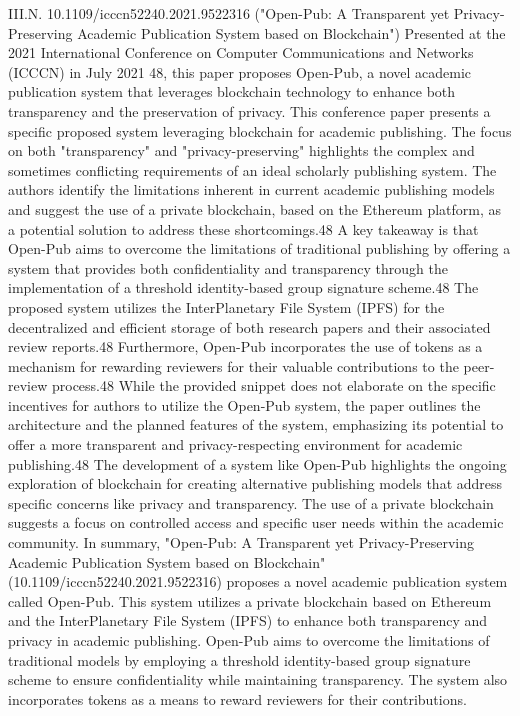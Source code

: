 \documentclass{article}
\begin{document}
III.N. 10.1109/icccn52240.2021.9522316 ("Open-Pub: A Transparent yet Privacy-Preserving Academic Publication System based on Blockchain")
Presented at the 2021 International Conference on Computer Communications and Networks (ICCCN) in July 2021 48, this paper proposes Open-Pub, a novel academic publication system that leverages blockchain technology to enhance both transparency and the preservation of privacy. This conference paper presents a specific proposed system leveraging blockchain for academic publishing. The focus on both "transparency" and "privacy-preserving" highlights the complex and sometimes conflicting requirements of an ideal scholarly publishing system. The authors identify the limitations inherent in current academic publishing models and suggest the use of a private blockchain, based on the Ethereum platform, as a potential solution to address these shortcomings.48 A key takeaway is that Open-Pub aims to overcome the limitations of traditional publishing by offering a system that provides both confidentiality and transparency through the implementation of a threshold identity-based group signature scheme.48 The proposed system utilizes the InterPlanetary File System (IPFS) for the decentralized and efficient storage of both research papers and their associated review reports.48 Furthermore, Open-Pub incorporates the use of tokens as a mechanism for rewarding reviewers for their valuable contributions to the peer-review process.48 While the provided snippet does not elaborate on the specific incentives for authors to utilize the Open-Pub system, the paper outlines the architecture and the planned features of the system, emphasizing its potential to offer a more transparent and privacy-respecting environment for academic publishing.48 The development of a system like Open-Pub highlights the ongoing exploration of blockchain for creating alternative publishing models that address specific concerns like privacy and transparency. The use of a private blockchain suggests a focus on controlled access and specific user needs within the academic community.
In summary, "Open-Pub: A Transparent yet Privacy-Preserving Academic Publication System based on Blockchain" (10.1109/icccn52240.2021.9522316) proposes a novel academic publication system called Open-Pub. This system utilizes a private blockchain based on Ethereum and the InterPlanetary File System (IPFS) to enhance both transparency and privacy in academic publishing. Open-Pub aims to overcome the limitations of traditional models by employing a threshold identity-based group signature scheme to ensure confidentiality while maintaining transparency. The system also incorporates tokens as a means to reward reviewers for their contributions.
\end{document}
